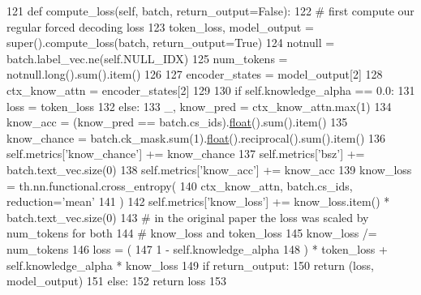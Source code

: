 \begin{DoxyCode}
121     \textcolor{keyword}{def }compute\_loss(self, batch, return\_output=False):
122         \textcolor{comment}{# first compute our regular forced decoding loss}
123         token\_loss, model\_output = super().compute\_loss(batch, return\_output=\textcolor{keyword}{True})
124         notnull = batch.label\_vec.ne(self.NULL\_IDX)
125         num\_tokens = notnull.long().sum().item()
126 
127         encoder\_states = model\_output[2]
128         ctx\_know\_attn = encoder\_states[2]
129 
130         \textcolor{keywordflow}{if} self.knowledge\_alpha == 0.0:
131             loss = token\_loss
132         \textcolor{keywordflow}{else}:
133             \_, know\_pred = ctx\_know\_attn.max(1)
134             know\_acc = (know\_pred == batch.cs\_ids).\hyperlink{namespaceprojects_1_1controllable__dialogue_1_1make__control__dataset_aa2b7207688c641dbc094ab44eca27113}{float}().sum().item()
135             know\_chance = batch.ck\_mask.sum(1).\hyperlink{namespaceprojects_1_1controllable__dialogue_1_1make__control__dataset_aa2b7207688c641dbc094ab44eca27113}{float}().reciprocal().sum().item()
136             self.metrics[\textcolor{stringliteral}{'know\_chance'}] += know\_chance
137             self.metrics[\textcolor{stringliteral}{'bsz'}] += batch.text\_vec.size(0)
138             self.metrics[\textcolor{stringliteral}{'know\_acc'}] += know\_acc
139             know\_loss = th.nn.functional.cross\_entropy(
140                 ctx\_know\_attn, batch.cs\_ids, reduction=\textcolor{stringliteral}{'mean'}
141             )
142             self.metrics[\textcolor{stringliteral}{'know\_loss'}] += know\_loss.item() * batch.text\_vec.size(0)
143             \textcolor{comment}{# in the original paper the loss was scaled by num\_tokens for both}
144             \textcolor{comment}{# know\_loss and token\_loss}
145             know\_loss /= num\_tokens
146             loss = (
147                 1 - self.knowledge\_alpha
148             ) * token\_loss + self.knowledge\_alpha * know\_loss
149         \textcolor{keywordflow}{if} return\_output:
150             \textcolor{keywordflow}{return} (loss, model\_output)
151         \textcolor{keywordflow}{else}:
152             \textcolor{keywordflow}{return} loss
153 
\end{DoxyCode}
\mbox{\label{classprojects_1_1wizard__of__wikipedia_1_1generator_1_1agents_1_1EndToEndAgent_ad5961a34fbea934bf2298c77ac220571}} 
